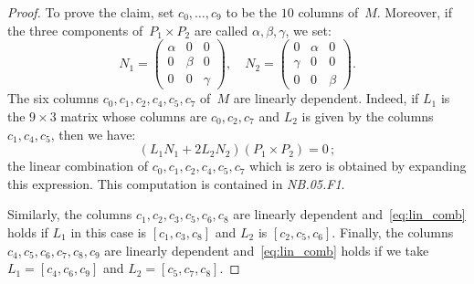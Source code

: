 \documentclass[a4paper, 11pt, reqno]{amsart}
\theoremstyle{plain}
\theoremstyle{definition}
\newcommand{\nb}[2]{\textsl{{NB}.{#1}.{#2}}}
\begin{document}
\begin{proof}
To prove the claim, set $c_0, \dots, c_9$ to be the $10$ columns of~$M$.
Moreover,
if the three components of~$P_1 \times P_2$ are called $\alpha, \beta, \gamma$, we set:
%
\[
  N_1 = \left(
  \begin{array}{ccc}
    \alpha & 0 & 0 \\
    0 & \beta & 0\\
    0 & 0 & \gamma
  \end{array}
  \right), \quad
  N_2 = \left(
  \begin{array}{ccc}
    0 & \alpha & 0 \\
    \gamma & 0 & 0\\
    0 & 0 & \beta
  \end{array}
  \right).
\]
%
The six
columns $c_0, c_1, c_2, c_4, c_5, c_7$ of~$M$ are linearly dependent. Indeed, if $L_1$ is the $9\times 3$ matrix whose columns are
$c_0, c_2, c_7$ and $L_2$ is given by the columns $c_1, c_4, c_5$,
then we have:
%
\begin{equation}
  (L_1 N_1 + 2 L_2N_2) (P_1 \times P_2) = 0 \,;
  \label{eq:lin_comb}
\end{equation}
%
the linear combination of $c_0, c_1, c_2, c_4, c_5, c_7$ which is zero
is obtained by expanding this expression. This computation is contained in \nb{05}{F1}.

Similarly, the columns $c_1, c_2, c_3, c_5, c_6, c_8$ are linearly dependent
and~\eqref{eq:lin_comb} holds if $L_1$ in this case is $[c_1, c_3, c_8]$ and
$L_2$ is $[c_2, c_5, c_6]$. Finally, the columns
$c_4, c_5, c_6, c_7, c_8, c_9$ are linearly dependent and~\eqref{eq:lin_comb}
holds if we take $L_1 = [c_4, c_6, c_9]$ and $L_2 = [c_5, c_7, c_8]$.


\end{proof}
\end{document}
